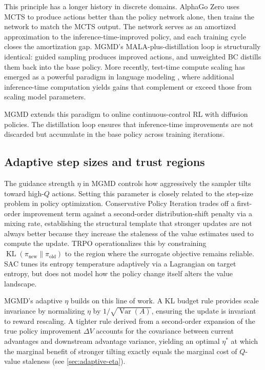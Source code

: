 \documentclass{article}
\theoremstyle{plain}
\theoremstyle{definition}
\theoremstyle{remark}
\DeclareMathOperator{\KL}{KL}
\DeclareMathOperator{\Var}{Var}
\begin{document}
This principle has a longer history in discrete domains. AlphaGo Zero \citep{silver2017mastering} uses MCTS to produce actions better than the policy network alone, then trains the network to match the MCTS output. The network serves as an amortized approximation to the inference-time-improved policy, and each training cycle closes the amortization gap. MGMD's MALA-plus-distillation loop is structurally identical: guided sampling produces improved actions, and unweighted BC distills them back into the base policy. More recently, test-time compute scaling has emerged as a powerful paradigm in language modeling \citep{snell2024scaling}, where additional inference-time computation yields gains that complement or exceed those from scaling model parameters.

MGMD extends this paradigm to online continuous-control RL with diffusion policies. The distillation loop ensures that inference-time improvements are not discarded but accumulate in the base policy across training iterations.

\subsection{Adaptive step sizes and trust regions}

The guidance strength $\eta$ in MGMD controls how aggressively the sampler tilts toward high-$Q$ actions. Setting this parameter is closely related to the step-size problem in policy optimization.
Conservative Policy Iteration \citep{kakade2002approximately} trades off a first-order improvement term against a second-order distribution-shift penalty via a mixing rate, establishing the structural template that stronger updates are not always better because they increase the staleness of the value estimates used to compute the update.
TRPO \citep{schulman2015trust} operationalizes this by constraining $\KL(\pi_{\mathrm{new}} \| \pi_{\mathrm{old}})$ to the region where the surrogate objective remains reliable.
SAC \citep{haarnoja2018sac} tunes its entropy temperature adaptively via a Lagrangian on target entropy, but does not model how the policy change itself alters the value landscape.

MGMD's adaptive $\eta$ builds on this line of work. A KL budget rule provides scale invariance by normalizing $\eta$ by $1/\sqrt{\Var(A)}$, ensuring the update is invariant to reward rescaling. A tighter rule derived from a second-order expansion of the true policy improvement $\Delta V$ accounts for the covariance between current advantages and downstream advantage variance, yielding an optimal $\eta^*$ at which the marginal benefit of stronger tilting exactly equals the marginal cost of $Q$-value staleness (see \cref{sec:adaptive-eta}).
\end{document}
